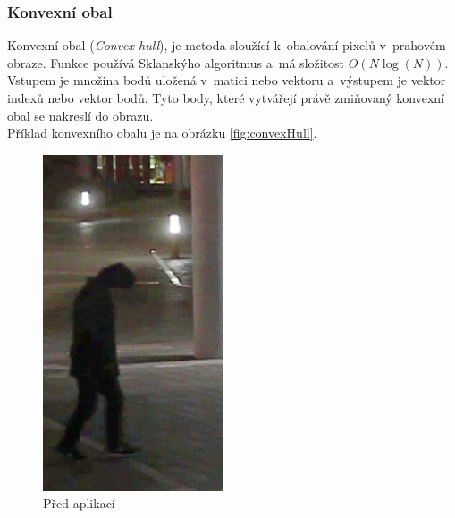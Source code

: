 \subsubsection*{Konvexní obal}
Konvexní obal (\textit{Convex hull}), je metoda sloužící k~obalování pixelů v~prahovém obraze. Funkce používá Sklanskýho algoritmus \cite{openCV:sklansky} a~má složitost  $O(N \log(N))$.  Vstupem je množina bodů uložená v~matici nebo vektoru a~výstupem je vektor indexů nebo vektor bodů. Tyto body, které vytvářejí právě zmiňovaný konvexní obal se nakreslí do obrazu. \\
Příklad konvexního obalu je na obrázku \ref{fig:convexHull}.
\begin{figure}[H]
\centering
\begin{minipage}{.5\textwidth}
  \centering
  \includegraphics[width=.5\linewidth]{figures/Hull_Original}
  \caption*{Před aplikací}
  \label{fig:original}
\end{minipage}%
\begin{minipage}{.5\textwidth}
  \centering

\end{minipage}
\end{figure}
